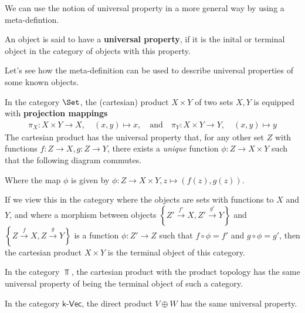 We can use the notion of universal property in a more general way by using a meta-defintion.
\begin{dfn}[]
  An object is said to have a \textbf{universal property}, if it is the inital or terminal object in the category of objects with this property.
\end{dfn}

Let's see how the meta-definition can be used to describe universal properties of some known objects.


\begin{ex}[Product]
  In the category $\Set$, the (cartesian) product $X \times Y$ of two sets $X,Y$ is equipped with \textbf{projection mappings}
  \begin{align*}
    \pi_X: X \times Y \to X, \quad (x,y) \mapsto x, 
    \quad \text{and} \quad
    \pi_Y: X \times Y \to Y, \quad (x,y) \mapsto y
  \end{align*}
  The cartesian product has the universal property that, for any other set $Z$ with functions $f: Z \to X, g: Z \to Y$, there exists a \emph{unique} function $\phi:Z \to X \times Y$ such that the following diagram commutes.
  \begin{center}
  \end{center}
  Where the map $\phi$ is given by $\phi: Z \to X \times Y, z \mapsto (f(z),g(z))$.
  
  If we view this in the category where the objects are sets with functions to $X$ and $Y$, and where a morphism between objects 
  $\left\{Z' \stackrel{f'}{\to}X, Z' \stackrel{g'}{\to}Y\right\}$
  and
  $\left\{Z \stackrel{f}{\to}X, Z \stackrel{g}{\to}Y\right\}$
  is a function $\phi: Z'  \to Z$ such that $f \circ \phi = f'$ and $g \circ \phi = g'$, 
  then the cartesian product $X \times Y$ is the terminal object of this category.

 In the category $\Top$, the cartesian product with the product topology has the same universal property of being the terminal object of such a category.

 In the category $\textsf{k-Vec}$, the direct product $V \oplus W$ has the same universal property.
\end{ex}

